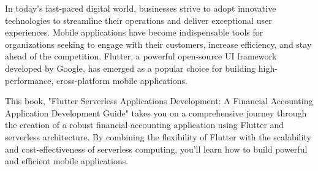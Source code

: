 

In today's fast-paced digital world, businesses strive to adopt innovative technologies to streamline their 
operations and deliver exceptional user experiences. Mobile applications have become indispensable tools 
for organizations seeking to engage with their customers, increase efficiency, and stay ahead of the competition. 
Flutter, a powerful open-source UI framework developed by Google, has emerged as a popular choice for building 
high-performance, cross-platform mobile applications.

This book, "Flutter Serverless Applications Development: A Financial Accounting Application Development Guide" 
takes you on a comprehensive journey through the creation of a robust financial accounting application using 
Flutter and serverless architecture. By combining the flexibility of Flutter with the scalability and 
cost-effectiveness of serverless computing, you'll learn how to build powerful and efficient mobile applications.

